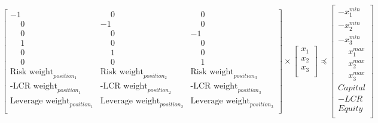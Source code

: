 \documentclass[letterpaper,10pt,english]{jupyterBook}
\begin{document}
\begin{equation*}
\begin{split}
\begin{array}{llll}
 \begin{bmatrix} 
		-1 & \phantom{-}0 & \phantom{-}0 \\
		\phantom{-}0 & -1 & \phantom{-}0 \\
		\phantom{-}0 & \phantom{-}0 & -1 \\
		\phantom{-}1 & \phantom{-}0 & \phantom{-}0 \\
		\phantom{-}0 & \phantom{-}1 & \phantom{-}0 \\
		\phantom{-}0 & \phantom{-}0 & \phantom{-}1 \\
   		\text{Risk weight}_{position_1} & \text{Risk weight}_{position_2} & \text{Risk weight}_{position_3} \\
   		\text{-LCR weight}_{position_1} & \text{-LCR weight}_{position_2} & \text{-LCR weight}_{position_3} \\
   		\text{Leverage weight}_{position_1} & \text{Leverage weight}_{position_2} & \text{Leverage weight}_{position_3} \\
\end{bmatrix} \times  \begin{bmatrix} 
		x_1 \\
		x_2  \\
		x_3 \\
\end{bmatrix} \preceq \begin{bmatrix} 
		-x_1^{min} \\
		-x_2^{min} \\
		-x_3^{min} \\
		\phantom{-}x_1^{max} \\
		\phantom{-}x_2^{max} \\
		\phantom{-}x_3^{max} \\
        Capital  \\
        -LCR \\
        Equity \\
\end{bmatrix}
\end{array}
\end{split}
\end{equation*}
\end{document}
